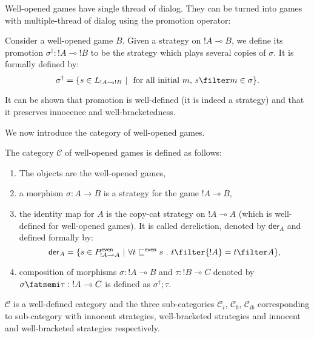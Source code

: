 Well-opened games have single thread of dialog. They can be turned
into games with multiple-thread of dialog using the promotion
operator:

\begin{definition}[Promotion]
Consider a well-opened game $B$. Given a strategy on ${!A} \multimap
B$, we define its promotion $\sigma^\dagger : {!A} \multimap {!B}$
to be the strategy which plays several copies of $\sigma$. It is
formally defined by:
$$ \sigma^\dagger = \{ s \in L_{{!A} \multimap !B} \ | \ \mbox{ for all initial $m$, } s \filter m \in \sigma  \}.$$
\end{definition}

It can be shown that promotion is well-defined (it is indeed a strategy) and that it preserves innocence and
well-bracketedness.


We now introduce the category of well-opened games.
\begin{definition}
The category $\mathcal{C}$ of well-opened games is defined as
follows:
\begin{enumerate}
\item The objects are the well-opened games,
\item a morphism $\sigma : A \rightarrow B$ is a strategy for the game $!A \multimap B$,
\item the identity map for $A$ is the copy-cat strategy on $!A \multimap A$ (which is well-defined for well-opened games).
It is called dereliction, denoted by
$\textsf{der}_A$ and defined formally by:
$$ \textsf{der}_A = \{ s \in P^{\textsf{even}}_{{!A} \multimap A} \ | \ \forall t \sqsubseteq^{\textsf{even}} s \ . \ t \filter {!A} = t \filter A \},$$
\item composition of morphisms $\sigma : {!A} \multimap B$ and $\tau : {!B} \multimap C$
denoted by $\sigma \fatsemi \tau : {!A} \multimap C$ is defined as $\sigma^\dagger;\tau$.
\end{enumerate}
\end{definition}
$\mathcal{C}$ is a well-defined category and the three sub-categories
$\mathcal{C}_i$, $\mathcal{C}_b$, $\mathcal{C}_{ib}$ corresponding to sub-category
with innocent strategies, well-bracketed strategies and innocent and well-bracketed strategies respectively.



